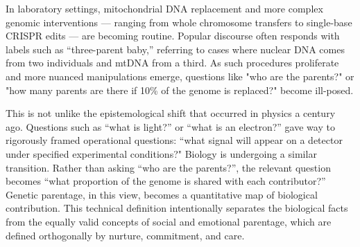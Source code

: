 \begin{commentary}
In laboratory settings, mitochondrial DNA replacement and more complex genomic interventions — ranging from whole chromosome transfers to single-base CRISPR edits — are becoming routine. Popular discourse often responds with labels such as “three-parent baby,” referring to cases where nuclear DNA comes from two individuals and mtDNA from a third. As such procedures proliferate and more nuanced manipulations emerge, questions like "who are the parents?" or "how many parents are there if 10\% of the genome is replaced?" become ill-posed.

This is not unlike the epistemological shift that occurred in physics a century ago. Questions such as “what is light?” or “what is an electron?” gave way to rigorously framed operational questions: “what signal will appear on a detector under specified experimental conditions?" Biology is undergoing a similar transition. Rather than asking “who are the parents?”, the relevant question becomes “what proportion of the genome is shared with each contributor?” Genetic parentage, in this view, becomes a quantitative map of biological contribution. This technical definition intentionally separates the biological facts from the equally valid concepts of social and emotional parentage, which are defined orthogonally by nurture, commitment, and care.
\end{commentary}
\clearpage

\vspace*{\fill}

